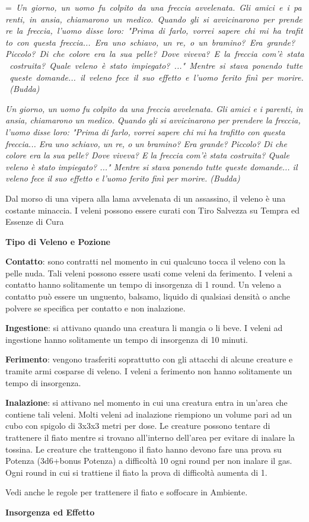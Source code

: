 \documentclass[a4paper,11pt,twoside,openany]{book}
\makeatletter
\newcommand{\mybox}[1]{%
	\setbox0=\hbox{#1}%
	\setlength{\@tempdima}{\dimexpr\wd0+13pt}%
	\begin{tcolorbox}[boxrule=0.5pt,arc=4pt, breakable,enhanced,
		left=6pt,right=6pt,top=6pt,bottom=6pt,boxsep=0pt,width=\@tempdima]
		#1
	\end{tcolorbox}
}
\makeatother
\begin{document}
{\label{veleni-e-pozioni}


\mybox{\textit{
Un giorno, un uomo fu colpito da una freccia avvelenata. Gli amici e i parenti, in ansia, chiamarono un medico. Quando gli si avvicinarono per prendere la freccia, l'uomo disse loro: "Prima di farlo, vorrei sapere chi mi ha trafitto con questa freccia... Era uno schiavo, un re, o un bramino? Era grande? Piccolo? Di che colore era la sua pelle? Dove viveva? E la freccia com'è stata costruita? Quale veleno è stato impiegato? ..." Mentre si stava ponendo tutte queste domande... il veleno fece il suo effetto e l'uomo ferito finì per morire. (Budda)
}}\medskip


Dal morso di una vipera alla lama avvelenata di un assassino, il veleno è una costante minaccia. I veleni possono essere curati con Tiro Salvezza su Tempra ed Essenze di Cura

\bigskip

\textbf{Tipo di Veleno e Pozione}

\textbf{Contatto}: sono contratti nel momento in cui qualcuno tocca il veleno con la pelle nuda. Tali veleni possono essere usati come veleni da ferimento. I veleni a contatto hanno solitamente un tempo di insorgenza di 1 round. Un veleno a contatto può essere un unguento, balsamo, liquido di qualsiasi densità o anche polvere se specifica per contatto e non inalazione.

\textbf{Ingestione}: si attivano quando una creatura li mangia o li beve. I veleni ad ingestione hanno solitamente un tempo di insorgenza di 10 minuti.

\textbf{Ferimento}: vengono trasferiti soprattutto con gli attacchi di alcune creature e tramite armi cosparse di veleno. I veleni a ferimento non hanno solitamente un tempo di insorgenza. 

\textbf{Inalazione}: si attivano nel momento in cui una creatura entra in un'area che contiene tali veleni. Molti veleni ad inalazione riempiono un volume pari ad un cubo con spigolo di 3x3x3 metri per dose. Le creature possono tentare di trattenere il fiato mentre si trovano all'interno dell'area per evitare di inalare la tossina. Le creature che trattengono il fiato hanno devono fare una prova su Potenza (3d6+bonus Potenza) a difficoltà 10 ogni round per non inalare il gas. Ogni round in cui si trattiene il fiato la prova di difficoltà aumenta di 1.

Vedi anche le regole per trattenere il fiato e soffocare in Ambiente.

\textbf{Insorgenza ed Effetto}

}
\end{document}
